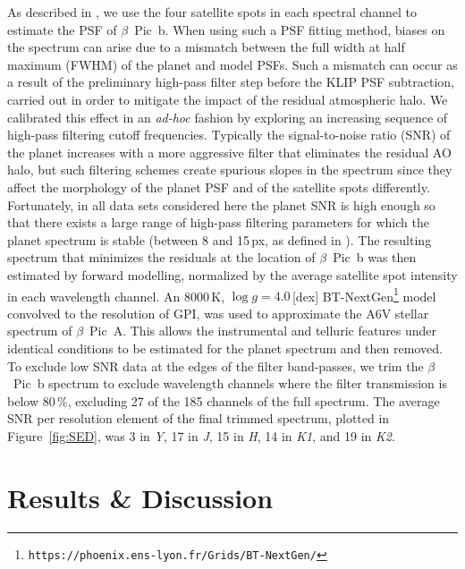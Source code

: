 \documentclass[twocolumn]{aastex6}
\begin{document}
As described in \citet{wang2016}, we use the four satellite spots in each spectral channel to estimate the PSF of $\beta$~Pic~b. When using such a PSF fitting method, biases on the spectrum can arise due to a mismatch between the full width at half maximum (FWHM) of the planet and model PSFs. Such a mismatch can occur as a result of the preliminary high-pass filter step before the KLIP PSF subtraction, carried out in order to mitigate the impact of the residual atmospheric halo. We calibrated this effect in an {\it ad-hoc} fashion by exploring an increasing sequence of high-pass filtering cutoff frequencies. Typically the signal-to-noise ratio (SNR) of the planet increases with a more aggressive filter that eliminates the residual AO halo, but such filtering schemes create spurious slopes in the spectrum since they affect the morphology of the planet PSF and of the satellite spots differently. Fortunately, in all data sets considered here the planet SNR is high enough so that there exists a large range of high-pass filtering parameters for which the planet spectrum is stable (between 8 and 15\,px, as defined in \citealt{wang2016}). The resulting spectrum that minimizes the residuals at the location of $\beta$~Pic~b was then estimated by forward modelling, normalized by the average satellite spot intensity in each wavelength channel. An 8000\,K, $\log g=4.0$\,[dex] \citep{Gray2006} {\sc BT-NextGen}\footnote{{\tt https://phoenix.ens-lyon.fr/Grids/BT-NextGen/}} model \citep{Allard2012} convolved to the resolution of GPI, was used to approximate the A6V stellar spectrum of $\beta$~Pic~A. This allows the instrumental and telluric features under identical conditions to be estimated for the planet spectrum and then removed. To exclude low SNR data at the edges of the filter band-passes, we trim the $\beta$~Pic~b spectrum to exclude wavelength channels where the filter transmission is below 80\,\%, excluding 27 of the 185 channels of the full spectrum. The average SNR per resolution element of the final trimmed spectrum, plotted in Figure~\ref{fig:SED}, was 3 in {\it Y}, 17 in {\it J}, 15 in {\it H}, 14 in {\it K1}, and 19 in {\it K2}.


\section{Results \& Discussion}
\label{sec:results}
\end{document}
